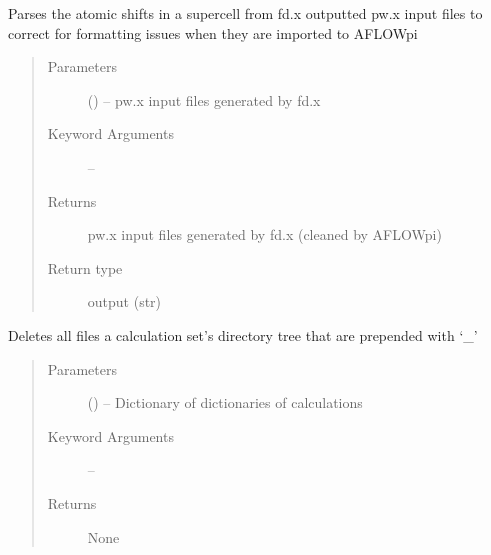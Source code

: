 \documentclass[letterpaper,10pt,english]{sphinxmanual}
\begin{document}
\begin{fulllineitems}
\label{\detokenize{run:run.clean_cell_params}}
Parses the atomic shifts in a supercell from fd.x
outputted pw.x input files to correct for formatting
issues when they are imported to AFLOWpi
\begin{quote}\begin{description}
\item[{Parameters}] \leavevmode
{} () -- pw.x input files generated by fd.x

\item[{Keyword Arguments}] \leavevmode
{} -- 

\item[{Returns}] \leavevmode
pw.x input files generated by fd.x (cleaned by AFLOWpi)

\item[{Return type}] \leavevmode
output (str)

\end{description}\end{quote}

\end{fulllineitems}


\begin{fulllineitems}
\label{\detokenize{run:run.cleanup}}
Deletes all files a calculation set's  directory
tree that are prepended with `\_'
\begin{quote}\begin{description}
\item[{Parameters}] \leavevmode
{} () -- Dictionary of dictionaries of calculations

\item[{Keyword Arguments}] \leavevmode
{} -- 

\item[{Returns}] \leavevmode
None

\end{description}\end{quote}

\end{fulllineitems}
\end{document}
